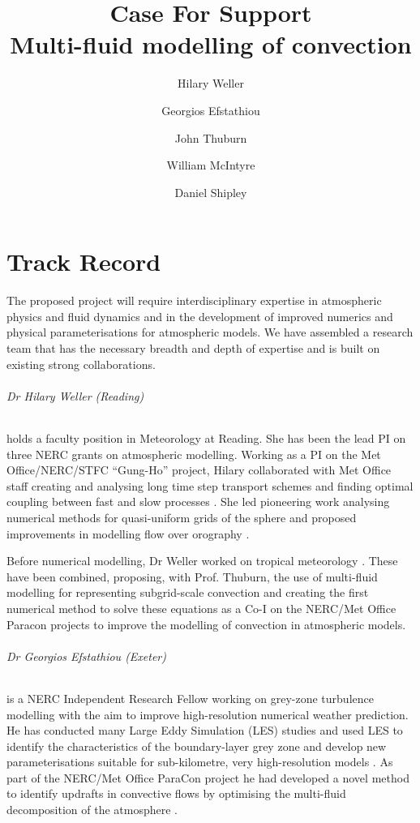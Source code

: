 \documentclass[11pt,a4paper]{article}
\begin{document}
\title{Case For Support \\ \Large
Multi-fluid modelling of convection
}
\author{Hilary Weller \and Georgios Efstathiou \and John Thuburn \and William McIntyre \and Daniel Shipley}
\date{}
\maketitle

\part{Track Record}

The proposed project will require interdisciplinary expertise in atmospheric physics and fluid dynamics
and in the development of improved numerics and physical parameterisations for atmospheric models.
We have assembled a research team that has the necessary breadth and depth of expertise and is built on
existing strong collaborations.


\paragraph*{Dr Hilary Weller (Reading)} holds a faculty position in Meteorology at Reading. She has been the lead PI on three NERC grants on atmospheric modelling. Working as a PI on the Met Office/NERC/STFC ``Gung-Ho'' project, Hilary collaborated with Met Office staff creating and analysing long time step transport schemes \cite[]{CWPS17,SWMD17} and finding optimal coupling between fast and slow processes \cite[][]{WLW13}. She led pioneering work analysing numerical methods for quasi-uniform grids of the sphere \cite[e.g.][]{Wel12,WTC12} and proposed improvements in modelling flow over orography \cite[]{WS14}. 

Before numerical modelling, Dr Weller worked on tropical meteorology \cite[e.g.][]{LGWS09}. These have been combined, proposing, with Prof. Thuburn, the use of multi-fluid modelling for representing subgrid-scale convection \cite[]{TWV+18} and creating the first numerical method to solve these equations \cite[]{WM19} as a Co-I on the NERC/Met Office Paracon projects to improve the modelling of convection in atmospheric models.

\paragraph*{Dr Georgios Efstathiou (Exeter)} is a NERC Independent Research Fellow working on grey-zone turbulence modelling with the aim to improve high-resolution numerical weather prediction. He has conducted many Large Eddy Simulation (LES) studies and used LES to identify the characteristics of the boundary-layer grey zone \citep[e.g.][]{efstathiou2015} and develop new parameterisations suitable for sub-kilometre, very high-resolution models \citep{efstathiou2016,efstathiou2018,efstathiou2019a}. As part of the NERC/Met Office ParaCon project he had developed a novel method to identify updrafts in convective flows by optimising the multi-fluid decomposition of the atmosphere \citep{ETB20}.
\end{document}
